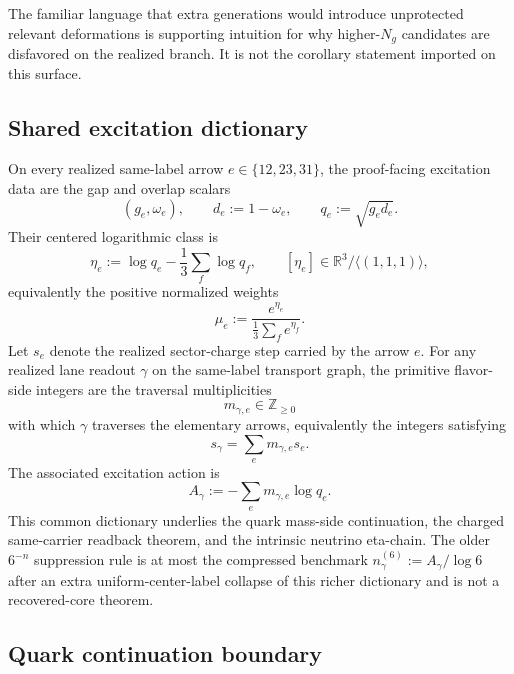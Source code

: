 The familiar language that extra generations would introduce unprotected relevant deformations is supporting intuition for why higher-\(N_g\) candidates are disfavored on the realized branch. It is not the corollary statement imported on this surface.

\subsection{Shared excitation dictionary}\label{122-yukawa-as-defect-mediated-overlap}

On every realized same-label arrow \(e\in\{12,23,31\}\), the proof-facing excitation data are the gap and overlap scalars
\[
(g_e,\omega_e),
\qquad
d_e:=1-\omega_e,
\qquad
q_e:=\sqrt{g_e d_e}.
\]
Their centered logarithmic class is
\[
\eta_e:=\log q_e-\frac13\sum_f \log q_f,
\qquad
[\eta_e]\in\mathbb R^3/\langle(1,1,1)\rangle,
\]
equivalently the positive normalized weights
\[
\mu_e:=\frac{e^{\eta_e}}{\frac13\sum_f e^{\eta_f}}.
\]
Let \(s_e\) denote the realized sector-charge step carried by the arrow \(e\).
For any realized lane readout \(\gamma\) on the same-label transport graph, the primitive flavor-side integers are the traversal multiplicities
\[
m_{\gamma,e}\in\mathbb Z_{\ge0}
\]
with which \(\gamma\) traverses the elementary arrows, equivalently the integers satisfying
\[
s_\gamma=\sum_e m_{\gamma,e}s_e .
\]
The associated excitation action is
\[
A_\gamma
:=
-\sum_e m_{\gamma,e}\log q_e .
\]
This common dictionary underlies the quark mass-side continuation, the charged same-carrier readback theorem, and the intrinsic neutrino eta-chain. The older \(6^{-n}\) suppression rule is at most the compressed benchmark \(n_\gamma^{(6)}:=A_\gamma/\log 6\) after an extra uniform-center-label collapse of this richer dictionary and is not a recovered-core theorem.

\subsection{Quark continuation boundary}

